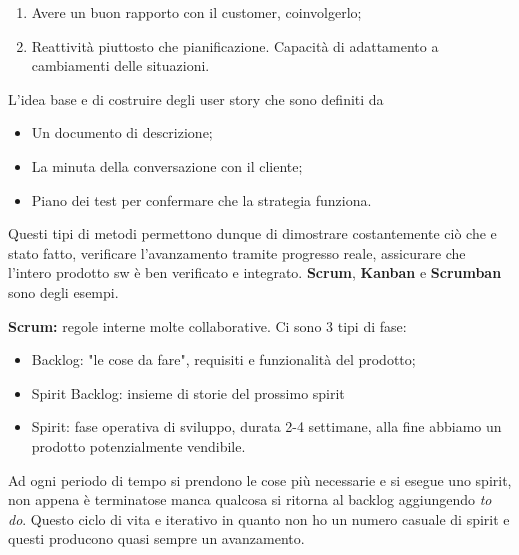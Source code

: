 \begin{itemize}
\begin{enumerate}
		\item Avere un buon rapporto con il customer, coinvolgerlo;
	
		\item Reattività piuttosto che pianificazione. Capacità di adattamento a cambiamenti delle situazioni.

	\end{enumerate}
	L'idea base e di costruire degli user story che sono definiti da
		\begin{itemize}
			\item Un documento di descrizione;
			\item La minuta della conversazione con il cliente;
			\item Piano dei test per confermare che la strategia funziona.
		\end{itemize}
	Questi tipi di metodi permettono dunque di dimostrare costantemente ciò che e stato fatto, verificare l'avanzamento tramite progresso reale, assicurare che l'intero prodotto sw è ben verificato e integrato.
	\textbf{Scrum}, \textbf{Kanban} e \textbf{Scrumban} sono degli esempi.
\end{itemize}
\textbf{Scrum:} regole interne molte collaborative. Ci sono 3 tipi di fase:
	 \begin{itemize}
	 		\item Backlog: "le cose da fare", requisiti e funzionalità del prodotto;
	 		\item Spirit Backlog: insieme di storie del prossimo spirit
	 		\item Spirit: fase operativa di sviluppo, durata 2-4 settimane, alla fine abbiamo un prodotto potenzialmente vendibile.
	 \end{itemize}
Ad ogni periodo di tempo si prendono le cose più necessarie e si esegue uno spirit, non appena è terminatose manca qualcosa si ritorna al backlog aggiungendo \textit{to do}. Questo ciclo di vita e iterativo in quanto non ho un numero casuale di spirit e questi producono quasi sempre un avanzamento.

